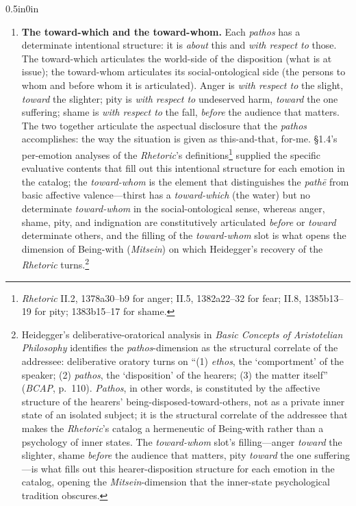 \documentclass{article}
\begin{document}
\begin{adjustwidth}{0.5in}{0in}
\begin{enumerate}
        \item \textbf{The toward-which and the toward-whom.} Each \textit{pathos} has a determinate intentional structure: it is \textit{about} this and \textit{with respect to} those. The toward-which articulates the world-side of the disposition (what is at issue); the toward-whom articulates its social-ontological side (the persons to whom and before whom it is articulated). Anger is \textit{with respect to} the slight, \textit{toward} the slighter; pity is \textit{with respect to} undeserved harm, \textit{toward} the one suffering; shame is \textit{with respect to} the fall, \textit{before} the audience that matters. The two together articulate the aspectual disclosure that the \textit{pathos} accomplishes: the way the situation is given as this-and-that, for-me. \S1.4's per-emotion analyses of the \textit{Rhetoric}'s definitions\footnote{\textit{Rhetoric} II.2, 1378a30--b9 for anger; II.5, 1382a22--32 for fear; II.8, 1385b13--19 for pity; 1383b15--17 for shame.} supplied the specific evaluative contents that fill out this intentional structure for each emotion in the catalog; the \textit{toward-whom} is the element that distinguishes the \textit{pathē} from basic affective valence---thirst has a \textit{toward-which} (the water) but no determinate \textit{toward-whom} in the social-ontological sense, whereas anger, shame, pity, and indignation are constitutively articulated \textit{before} or \textit{toward} determinate others, and the filling of the \textit{toward-whom} slot is what opens the dimension of Being-with (\textit{Mitsein}) on which Heidegger's recovery of the \textit{Rhetoric} turns.\footnote{Heidegger's deliberative-oratorical analysis in \textit{Basic Concepts of Aristotelian Philosophy} identifies the \textit{pathos}-dimension as the structural correlate of the addressee: deliberative oratory turns on ``(1) \textit{ethos}, the `comportment' of the speaker; (2) \textit{pathos}, the `disposition' of the hearers; (3) the matter itself'' (\textit{BCAP}, p.~110). \textit{Pathos}, in other words, is constituted by the affective structure of the hearers' being-disposed-toward-others, not as a private inner state of an isolated subject; it is the structural correlate of the addressee that makes the \textit{Rhetoric}'s catalog a hermeneutic of Being-with rather than a psychology of inner states. The \textit{toward-whom} slot's filling---anger \textit{toward} the slighter, shame \textit{before} the audience that matters, pity \textit{toward} the one suffering---is what fills out this hearer-disposition structure for each emotion in the catalog, opening the \textit{Mitsein}-dimension that the inner-state psychological tradition obscures.}
              

\end{enumerate}
\end{adjustwidth}
\end{document}
